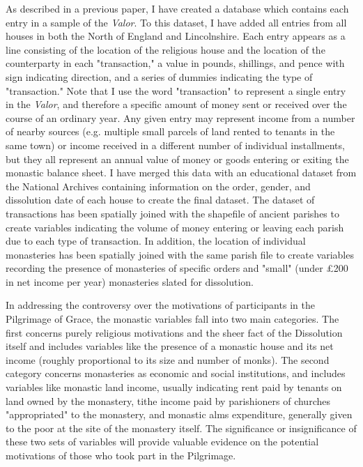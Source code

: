 \documentclass[12pt]{article}
\begin{document}
As described in a previous paper, I have created a database which contains each entry in a sample of the \emph{Valor}. To this dataset, I have added all entries from all houses in both the North of England and Lincolnshire. Each entry appears as a line consisting of the location of the religious house and the location of the counterparty in each "transaction," a value in pounds, shillings, and pence with sign indicating direction, and a series of dummies indicating the type of "transaction." Note that I use the word "transaction" to represent a single entry in the \emph{Valor}, and therefore a specific amount of money sent or received over the course of an ordinary year. Any given entry may represent income from a number of nearby sources (e.g. multiple small parcels of land rented to tenants in the same town) or income received in a different number of individual installments, but they all represent an annual value of money or goods entering or exiting the monastic balance sheet. I have merged this data with an educational dataset from the National Archives containing information on the order, gender, and dissolution date of each house to create the final dataset. The dataset of transactions has been spatially joined with the shapefile of ancient parishes to create variables indicating the volume of money entering or leaving each parish due to each type of transaction. In addition, the location of individual monasteries has been spatially joined with the same parish file to create variables recording the presence of monasteries of specific orders and "small" (under \pounds200 in net income per year) monasteries slated for dissolution.

In addressing the controversy over the motivations of participants in the Pilgrimage of Grace, the monastic variables fall into two main categories. The first concerns purely religious motivations and the sheer fact of the Dissolution itself and includes variables like the presence of a monastic house and its net income (roughly proportional to its size and number of monks). The second category concerns monasteries as economic and social institutions, and includes variables like monastic land income, usually indicating rent paid by tenants on land owned by the monastery, tithe income paid by parishioners of churches "appropriated" to the monastery, and monastic alms expenditure, generally given to the poor at the site of the monastery itself. The significance or insignificance of these two sets of variables will provide valuable evidence on the potential motivations of those who took part in the Pilgrimage. 
\end{document}
